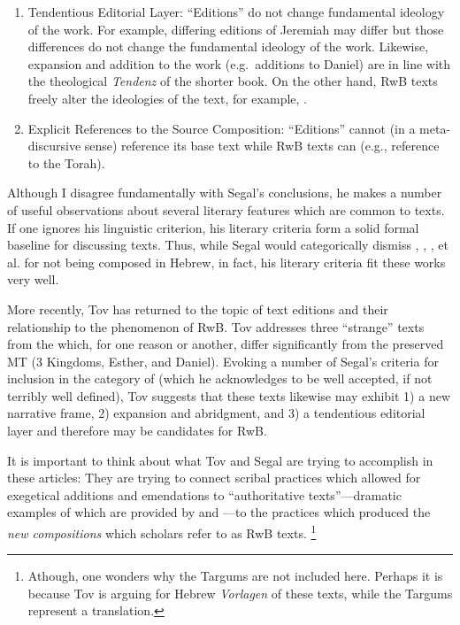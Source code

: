 \begin{enumerate}
    \item Tendentious Editorial Layer: ``Editions'' do not change fundamental ideology of the work. For example, differing editions of Jeremiah may differ but those differences do not change the fundamental ideology of the work. Likewise, expansion and addition to the work (e.g.~additions to Daniel) are in line with the theological \emph{Tendenz} of the shorter book. On the other hand, RwB texts freely alter the ideologies of the text, for example, \jub.\autocite[25]{segal_henze2005}

    \item Explicit References to the Source Composition: ``Editions'' cannot (in a meta-discursive sense) reference its base text while RwB texts can (e.g., \jub reference to the Torah).
\end{enumerate} 

Although I disagree fundamentally with Segal's conclusions, he makes a number of useful observations about several literary features which are common to \rwb texts. If one ignores his linguistic criterion, his literary criteria form a solid formal baseline for discussing \rwb texts. Thus, while Segal would categorically dismiss \ga, \ant, \lab, et al. for not being composed in Hebrew, in fact, his literary criteria fit these works very well.

More recently, Tov has returned to the topic of text editions and their relationship to the phenomenon of RwB.\autocite{tov_krarrer-kraus2008} Tov addresses three ``strange'' texts from the \lxx which, for one reason or another, differ significantly from the preserved MT (3 Kingdoms, Esther, and Daniel). Evoking a number of Segal's criteria\autocite{segal_henze2005} for inclusion in the category of \rwb (which he acknowledges to be well accepted, if not terribly well defined), Tov suggests that these \lxx texts likewise may exhibit 1) a new narrative frame, 2) expansion and abridgment, and 3) a tendentious editorial layer and therefore may be candidates for RwB. 

It is important to think about what Tov and Segal are trying to accomplish in these articles: They are trying to connect scribal practices which allowed for exegetical additions and emendations to ``authoritative texts''---dramatic examples of which are provided by \sampent and \lxx---to the practices which produced the \emph{new compositions} which scholars refer to as RwB texts.%
%
\footnote{Athough, one wonders why the Targums are not included here. Perhaps it is because Tov is arguing for Hebrew \emph{Vorlagen} of these texts, while the Targums represent a translation.}

